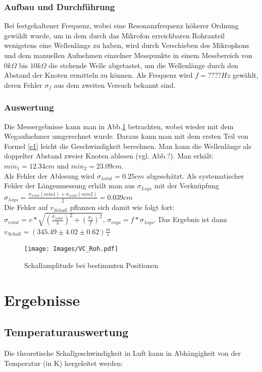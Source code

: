 \documentclass[]{article}
\begin{document}
	\subsubsection{Aufbau und Durchführung}
	Bei festgehaltener Frequenz, wobei eine Resonanzfrequenz höherer Ordnung gewählt wurde, um in dem durch das Mikrofon erreichbaren Rohranteil wenigstens eine Wellenlänge zu haben, wird durch Verschieben des Mikrophons und dem manuellen Aufnehmen einzelner Messpunkte in einem Messbereich von $0k\Omega$ bis $10k\Omega$ die stehende Welle abgetastet, um die Wellenlänge durch den Abstand der Knoten ermitteln zu können. Als Frequenz wird $f=????Hz$ gewählt, deren Fehler $\sigma_f$ aus dem zweiten Versuch bekannt sind.
	\subsubsection{Auswertung}
	
	Die Messergebnisse kann man in Abb.\ref{Vc_Roh} betrachten, wobei wieder mit dem Wegaufnehmer umgerechnet wurde. Daraus kann man mit dem ersten Teil von Formel \ref{e1} leicht die Geschwindigkeit berechnen. Man kann die Wellenlänge als doppelter Abstand zweier Knoten ablesen (vgl. Abb.?). Man erhält: $min_1=12.34cm$ und $min_2=23.09cm$.\\ 
	 Als Fehler der Ablesung wird $\sigma_{\lambda stat}=0.25cm$ abgeschätzt. Als systematischer Fehler der Längenmessung erhält man aus $\sigma_{Lsys}$ mit der Verknüpfung $\sigma_{\lambda sys} = \frac{\sigma_{\lambda stat}(min1)+\sigma_{\lambda stat}(min2)}{2}=0.039cm$\\
	 Die Fehler auf $v_{Schall}$ pflanzen sich damit wie folgt fort: $\sigma_{vstat}=v*\sqrt{(\frac{\sigma_{\lambda stat}}{\lambda})^2+(\frac{\sigma_f}{f})^2}$, 
	 $\sigma_{vsys}=f*\sigma_{\lambda sys}$.
	 Das Ergebnis ist dann $v_{Schall}=(345.49 \pm 4.02 \pm 0.62)\frac{m}{s}$

	\begin{figure}
	\begin{center}
		\texttt{[image: Images/VC\_Roh.pdf]}
		\caption{Schallamplitude bei bestimmten Positionen}
		\label{Vc_Roh}
	\end{center}
	\end{figure}
	

	\section{Ergebnisse}
	\subsection{Temperaturauswertung}
	Die theoretische Schallgeschwindigkeit in Luft kann in Abhängigkeit von der Temperatur (in K) hergeleitet werden:
	
\end{document}

